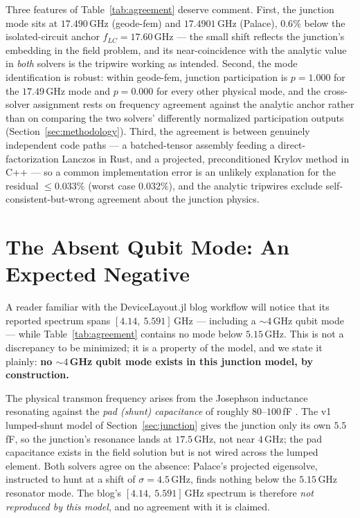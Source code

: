 \documentclass{anvil-paper}
\begin{document}
Three features of Table~\ref{tab:agreement} deserve comment. First, the
junction mode sits at $17.490$\,GHz (geode-fem) and $17.4901$\,GHz
(Palace), $0.6\%$ below the isolated-circuit anchor
$f_{LC} = 17.60$\,GHz --- the small shift reflects the junction's embedding
in the field problem, and its near-coincidence with the analytic value in
\emph{both} solvers is the tripwire working as intended. Second, the mode
identification is robust: within geode-fem, junction participation is
$p = 1.000$ for the $17.49$\,GHz mode and $p = 0.000$ for every other
physical mode, and the cross-solver assignment rests on frequency agreement
against the analytic anchor rather than on comparing the two solvers'
differently normalized participation outputs
(Section~\ref{sec:methodology}). Third, the agreement is between genuinely
independent code paths --- a batched-tensor assembly feeding a
direct-factorization Lanczos in Rust, and a projected, preconditioned
Krylov method in C++ --- so a common implementation error is an unlikely
explanation for the residual $\leq 0.033\%$ (worst case $0.032\%$), and
the analytic tripwires exclude self-consistent-but-wrong agreement about
the junction physics.

\section{The Absent Qubit Mode: An Expected Negative}
\label{sec:absent-mode}

A reader familiar with the DeviceLayout.jl blog workflow
\citep{devicelayout-blog} will notice that its reported spectrum spans
$[4.14,\ 5.591]$\,GHz --- including a ${\sim}4$\,GHz qubit mode --- while
Table~\ref{tab:agreement} contains no mode below $5.15$\,GHz. This is not a
discrepancy to be minimized; it is a property of the model, and we state it
plainly: \textbf{no ${\sim}4$\,GHz qubit mode exists in this junction model,
by construction.}

The physical transmon frequency arises from the Josephson inductance
resonating against the \emph{pad (shunt) capacitance} of roughly
$80$--$100$\,fF \citep{koch2007}. The v1 lumped-shunt model of
Section~\ref{sec:junction} gives the junction only its own $5.5$\,fF, so
the junction's resonance lands at $17.5$\,GHz, not near $4$\,GHz; the pad
capacitance exists in the field solution but is not wired across the
lumped element. Both solvers agree on the absence: Palace's projected
eigensolve, instructed to hunt at a shift of $\sigma = 4.5$\,GHz, finds
nothing below the $5.15$\,GHz resonator mode. The blog's
$[4.14,\ 5.591]$\,GHz spectrum is therefore \emph{not reproduced by this
model}, and no agreement with it is claimed.
\end{document}
